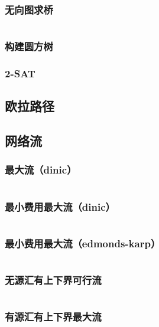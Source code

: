 \documentclass[12pt, a4paper, oneside]{ctexart}
\begin{document}
\begin{multicols}{2}
        \subsubsection{无向图求桥}
        \inputminted{cpp}{src/graph/tarjan-edge.cpp}
        \subsubsection{构建圆方树}
        
        \subsubsection{2-SAT}
        
        \subsection{欧拉路径}
        
        \subsection{网络流}
        \subsubsection{最大流（dinic）}
        \inputminted{cpp}{src/graph/dinic.cpp}
        \subsubsection{最小费用最大流（dinic）}
        \inputminted{cpp}{src/graph/mcmf-dinic.cpp}
        \subsubsection{最小费用最大流（edmonds-karp）}
        \inputminted{cpp}{src/graph/mcmf-ek.cpp}
        \subsubsection{无源汇有上下界可行流}
        \inputminted{cpp}{src/graph/feasible-bounded-flow.cpp}
        \subsubsection{有源汇有上下界最大流}
        \inputminted{cpp}{src/graph/max-bounded-flow.cpp}


\end{multicols}
\end{document}
